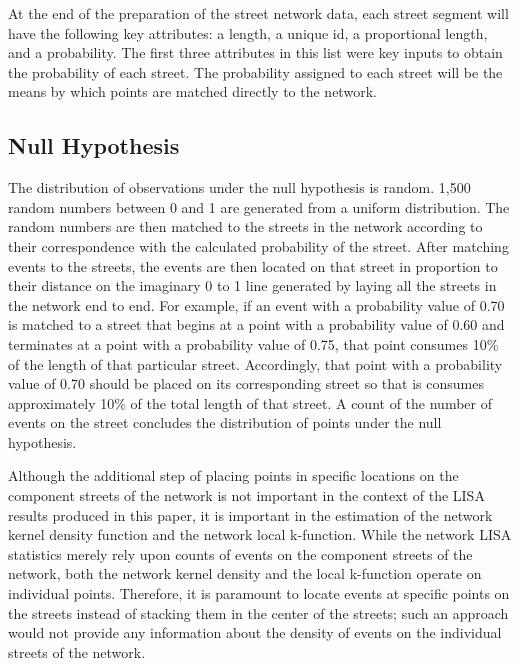 \documentclass[12pt, letterpaper]{article}
\begin{document}
At the end of the preparation of the street network data, each street segment will have the following key attributes: a length, a unique id, a proportional length, and a probability. The first three attributes in this list were key inputs to obtain the probability of each street. The probability assigned to each street will be the means by which points are matched directly to the network.

\subsection {Null Hypothesis}
The distribution of observations under the null hypothesis is random. 1,500 random numbers between 0 and 1 are generated from a uniform distribution. The random numbers are then matched to the streets in the network according to their correspondence with the calculated probability of the street. After matching events to the streets, the events are then located on that street in proportion to their distance on the imaginary 0 to 1 line generated by laying all the streets in the network end to end. For example, if an event with a probability value of 0.70 is matched to a street that begins at a point with a probability value of 0.60 and terminates at a point with a probability value of 0.75, that point consumes 10\% of the length of that particular street. Accordingly, that point with a probability value of 0.70 should be placed on its corresponding street so that is consumes approximately 10\% of the total length of that street. A count of the number of events on the street concludes the distribution of points under the null hypothesis.

Although the additional step of placing points in specific locations on the component streets of the network is not important in the context of the LISA results produced in this paper, it is important in the estimation of the network kernel density function and the network local k-function. While the network LISA statistics merely rely upon counts of events on the component streets of the network, both the network kernel density and the local k-function operate on individual points. Therefore, it is paramount to locate events at specific points on the streets instead of stacking them in the center of the streets; such an approach would not provide any information about the density of events on the individual streets of the network. %
\end{document}
